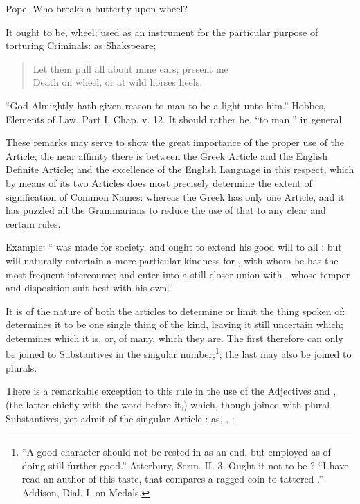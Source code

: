 {  \begin{aquote}{Pope.}
    Who breaks a butterfly upon  wheel?
  \end{aquote}

  It ought to be,  wheel; used as an instrument for the
  particular purpose of torturing Criminals: as Shakspeare;

  \begin{quote}
    Let them pull all about mine ears; present me\\
    Death on  wheel, or at wild horses heels.
  \end{quote}

  ``God Almightly hath given reason to  man to be a light unto
  him.'' Hobbes, Elements of Law, Part I. Chap. v. 12. It should rather
  be, ``to man,'' in general.

  These remarks may serve to show the great importance of the proper use
  of the Article; the near affinity there is between the Greek Article
  and the English Definite Article; and the excellence of the English
  Language in this respect, which by means of its two Articles does most
  precisely determine the extent of signification of Common Names:
  whereas the Greek has only one Article, and it has puzzled all the
  Grammarians to reduce the use of that to any clear and certain rules.}

Example: `` was made for society, and ought to extend his good
will to all : but  will naturally entertain a more
particular kindness for , with whom he has the most frequent
intercourse; and enter into a still closer union with ,
whose temper and disposition suit best with his own.''

It is of the nature of both the articles to determine or limit the thing
spoken of:  determines it to be one single thing of the kind,
leaving it still uncertain which;  determines which it is, or,
of many, which they are. The first therefore can only be joined to
Substantives in the singular number;\footnote{``A good character should
  not be rested in as an end, but employed as  of doing
  still further good.'' Atterbury, Serm. II. 3. Ought it not to be ? ``I have read an author of this taste, that compares a ragged
coin to  tattered .'' Addison, Dial. I. on Medals.};
the last may also be joined to plurals.

There is a remarkable exception to this rule in the use of the
Adjectives  and , (the latter chiefly with the word
 before it,) which, though joined with plural Substantives,
yet admit of the singular Article : as, , :

